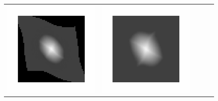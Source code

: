 \begin{figure}[!tb]
\begin{tabular}{c@{}c@{}c@{}c@{}c}
  \includegraphics[scale=0.18,trim={5ex 5ex 5ex 5ex},clip=true]{ScriptedImages/elastix_BS_MSD_Image.pdf}&
  \includegraphics[scale=0.18,trim={5ex 5ex 5ex 5ex},clip=true]{ScriptedImages/itkv4_SVF_ANTSCC_Image.pdf}&

\end{tabular}
\end{figure}
